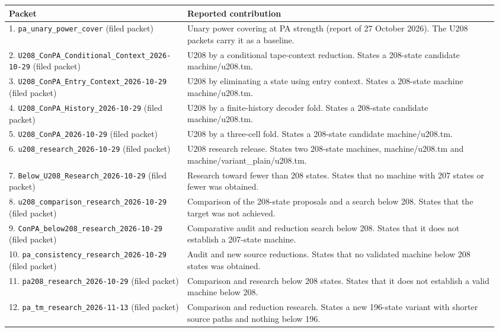 \begin{longtable}{@{}p{0.35\linewidth}p{0.61\linewidth}@{}}
\toprule Packet & Reported contribution \\ \midrule\endhead
1. \nolinkurl{pa_unary_power_cover} (filed packet) & Unary power covering at PA strength (report of 27 October 2026). The U208 packets carry it as a baseline.\\[5pt]
2. \nolinkurl{U208_ConPA_Conditional_Context_2026-10-29} (filed packet) & U208 by a conditional tape-context reduction. States a 208-state candidate machine/u208.tm.\\[5pt]
3. \nolinkurl{U208_ConPA_Entry_Context_2026-10-29} (filed packet) & U208 by eliminating a state using entry context. States a 208-state machine machine/u208.tm.\\[5pt]
4. \nolinkurl{U208_ConPA_History_2026-10-29} (filed packet) & U208 by a finite-history decoder fold. States a 208-state candidate machine/u208.tm.\\[5pt]
5. \nolinkurl{U208_ConPA_2026-10-29} (filed packet) & U208 by a three-cell fold. States a 208-state candidate machine/u208.tm.\\[5pt]
6. \nolinkurl{u208_research_2026-10-29} (filed packet) & U208 research release. States two 208-state machines, machine/u208.tm and machine/variant\_plain/u208.tm.\\[5pt]
7. \nolinkurl{Below_U208_Research_2026-10-29} (filed packet) & Research toward fewer than 208 states. States that no machine with 207 states or fewer was obtained.\\[5pt]
8. \nolinkurl{u208_comparison_research_2026-10-29} (filed packet) & Comparison of the 208-state proposals and a search below 208. States that the target was not achieved.\\[5pt]
9. \nolinkurl{ConPA_below208_research_2026-10-29} (filed packet) & Comparative audit and reduction search below 208. States that it does not establish a 207-state machine.\\[5pt]
10. \nolinkurl{pa_consistency_research_2026-10-29} (filed packet) & Audit and new source reductions. States that no validated machine below 208 states was obtained.\\[5pt]
11. \nolinkurl{pa208_research_2026-10-29} (filed packet) & Comparison and research below 208 states. States that it does not establish a valid machine below 208.\\[5pt]
12. \nolinkurl{pa_tm_research_2026-11-13} (filed packet) & Comparison and reduction research. States a new 196-state variant with shorter source paths and nothing below 196.\\[5pt]

\end{longtable}
